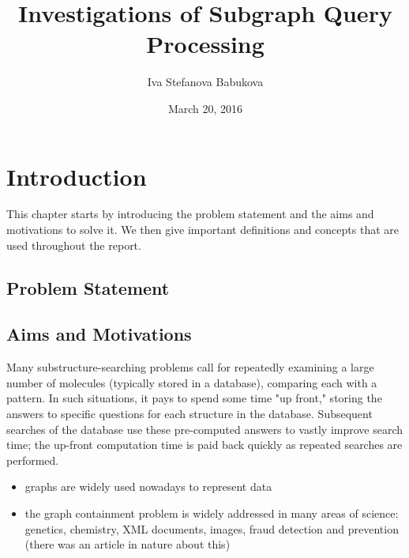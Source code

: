 \documentclass{l4proj}
\begin{document}
\title{Investigations of Subgraph Query Processing}
\author{Iva Stefanova Babukova}
\date{March 20, 2016}
\maketitle

\begin{abstract}


\end{abstract}

\educationalconsent
%
%
\tableofcontents
\chapter{Introduction}
\label{ch:introduction}
This chapter starts by introducing the problem statement and the aims and motivations to solve it. We then give important definitions and concepts that are used throughout the report.

\section{Problem Statement}
\section{Aims and Motivations}  
    Many substructure-searching problems call for repeatedly examining a large number of molecules (typically stored in a database), comparing each with a pattern. In such situations, it pays to spend some time "up front," storing the answers to specific questions for each structure in the database. Subsequent searches of the database use these pre-computed answers to vastly improve search time; the up-front computation time is paid back quickly as repeated searches are performed.
        \begin{itemize}
            \item graphs are widely used nowadays to represent data
            \item the graph containment problem is widely addressed in many areas of science: genetics, chemistry, XML documents, images, fraud detection and prevention (there was an article in nature about this)
        \end{itemize}
        
\end{document}
